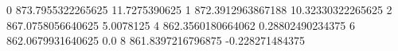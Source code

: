 0 873.7955322265625 11.7275390625
1 872.3912963867188 10.32330322265625
2 867.0758056640625 5.0078125
4 862.3560180664062 0.28802490234375
6 862.0679931640625 0.0
8 861.8397216796875 -0.228271484375
